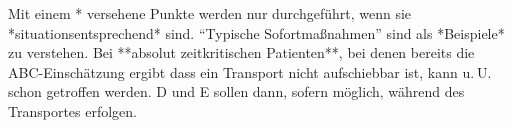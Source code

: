 {\begin{minipage}[t]{\linewidth -
{2\fboxrule} - {2\fboxsep}}
\begin{minipage}[t]{\linewidth}
{\vspace{-0.5\baselineskip}\begin{center}

{\tiny Mit einem * versehene Punkte werden nur durchgeführt,
wenn sie *situationsentsprechend* sind. \enquote{Typische
Sofortmaßnahmen} sind als *Beispiele* zu verstehen.
Bei **absolut zeitkritischen Patienten**, bei denen bereits die 
ABC-Einschätzung ergibt dass ein Transport nicht aufschiebbar ist, 
kann u. U. schon  getroffen werden. 
D und E sollen dann, sofern möglich, während des 
Transportes erfolgen. }
\end{center}
}
\end{minipage}
\end{minipage}\vspace{-\baselineskip}
}
{}

\vfill
\restoregeometry\pagestyle{fancy}

